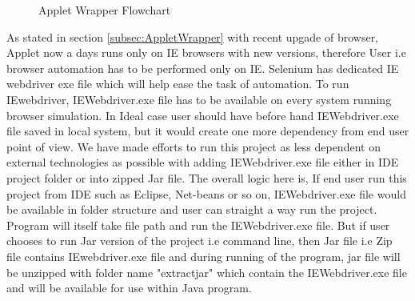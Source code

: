 \documentclass[article,type=msc,colorback,accentcolor=tud9c,twoside,11pt]{tudthesis}
\begin{document}
\begin{center}
\begin{figure}[h]
  \caption{Applet Wrapper Flowchart} 
  \label{fig:AppletwrapperAlgorithm}
\end{figure}
\end{center}
As stated in section \ref{subsec:AppletWrapper} with recent upgade of browser, Applet now a days runs only on IE browsers with new versions, therefore User i.e browser automation has to be performed only on IE. Selenium has dedicated IE webdriver  exe file which will help ease the task of automation. To run IEwebdriver, IEWebdriver.exe file has to be available on every system running browser simulation. In Ideal case user should have before hand IEWebdriver.exe file saved in local system, but it would create one more dependency from end user point of view. We have made efforts to run this project as less dependent on external technologies as possible with adding IEWebdriver.exe file either in IDE project folder or into zipped Jar file. The overall logic here is, If end user run this project from IDE such as Eclipse, Net-beans or so on, IEWebdriver.exe file would be available in folder structure and user can straight a way run the project. Program will itself take file path and run the IEWebdriver.exe file. But if user chooses to run Jar version of the project i.e command line, then Jar file i.e Zip file contains IEwebdriver.exe file and during running of the program, jar file will be unzipped with folder name "extractjar" which contain the IEWebdriver.exe file and will be available for use within Java program.
\end{document}
